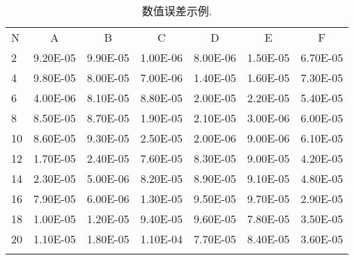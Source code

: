 \documentclass[master,print]{shnuthesis}
\begin{document}
\begin{table}[htp!]
\centering
\renewcommand\arraystretch{1.2} %
\caption{数值误差示例.}
\label{tab:error2}
\begin{tabularx}{0.9\textwidth}{||P{1cm}|C|C|C|C|C|C||}
\Xhline{2\arrayrulewidth}
N  & A       & B    & C       & D      & E       & F   \\
\Xhline{2\arrayrulewidth}
2  & 9.20E-05 & 9.90E-05 & 1.00E-06 & 8.00E-06 & 1.50E-05 & 6.70E-05 \\
4  & 9.80E-05 & 8.00E-05 & 7.00E-06 & 1.40E-05 & 1.60E-05 & 7.30E-05 \\
6  & 4.00E-06 & 8.10E-05 & 8.80E-05 & 2.00E-05 & 2.20E-05 & 5.40E-05 \\
8  & 8.50E-05 & 8.70E-05 & 1.90E-05 & 2.10E-05 & 3.00E-06 & 6.00E-05 \\
10 & 8.60E-05 & 9.30E-05 & 2.50E-05 & 2.00E-06 & 9.00E-06 & 6.10E-05 \\
12 & 1.70E-05 & 2.40E-05 & 7.60E-05 & 8.30E-05 & 9.00E-05 & 4.20E-05 \\
14 & 2.30E-05 & 5.00E-06 & 8.20E-05 & 8.90E-05 & 9.10E-05 & 4.80E-05 \\
16 & 7.90E-05 & 6.00E-06 & 1.30E-05 & 9.50E-05 & 9.70E-05 & 2.90E-05 \\
18 & 1.00E-05 & 1.20E-05 & 9.40E-05 & 9.60E-05 & 7.80E-05 & 3.50E-05 \\
20 & 1.10E-05 & 1.80E-05 & 1.10E-04   & 7.70E-05 & 8.40E-05 & 3.60E-05  \\
\Xhline{2\arrayrulewidth}
\end{tabularx}
\end{table}





\backmatter  %





%




\end{document}
